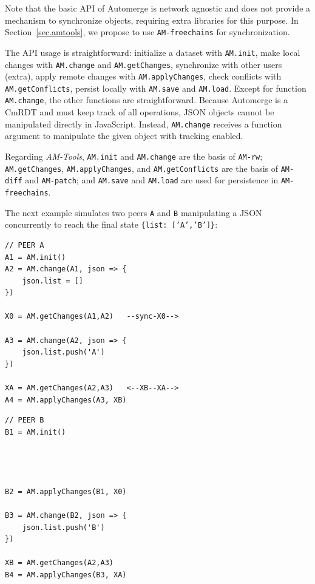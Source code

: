 \documentclass[12pt]{article}
\newcommand{\AMT}      {\emph{AM-Tools}\xspace}
\newcommand{\code}[1]  {\texttt{\footnotesize{#1}}}
\newcommand{\amrw}       {\texttt{AM-rw}\xspace}
\newcommand{\amdiff}     {\texttt{AM-diff}\xspace}
\newcommand{\ampatch}    {\texttt{AM-patch}\xspace}
\begin{document}
Note that the basic API of Automerge is network agnostic and does not provide
a mechanism to synchronize objects, requiring extra libraries for this purpose.
In Section~\ref{sec.amtools}, we propose to use \code{AM-freechains} for
synchronization.

The API usage is straightforward:
    initialize a dataset with \code{AM.init},
    make local changes with \code{AM.change} and \code{AM.getChanges},
    synchronize with other users (extra),
    apply remote changes with \code{AM.applyChanges},
    check conflicts with \code{AM.getConflicts},
    persist locally with \code{AM.save} and \code{AM.load}.
Except for function \code{AM.change}, the other functions are straightforward.
%
Because Automerge is a CmRDT and must keep track of all operations, JSON
objects cannot be manipulated directly in JavaScript.
Instead, \code{AM.change} receives a function argument to manipulate
the given object with tracking enabled.

Regarding \AMT,
    \code{AM.init} and \code{AM.change} are the basis of \amrw;
    \code{AM.getChanges}, \code{AM.applyChanges}, and \code{AM.getConflicts}
    are the basis of \amdiff and \ampatch; and
    \code{AM.save} and \code{AM.load} are used for persistence in
    \code{AM-freechains}.

The next example simulates two peers \code{A} and \code{B} manipulating a
JSON concurrently to reach the final state \code{\{list:~['A','B']\}}:

\noindent
{\footnotesize
\begin{minipage}[t]{0.6\textwidth}
\begin{verbatim}
// PEER A
A1 = AM.init()
A2 = AM.change(A1, json => {
    json.list = []
})

X0 = AM.getChanges(A1,A2)   --sync-X0-->

A3 = AM.change(A2, json => {
    json.list.push('A')
})

XA = AM.getChanges(A2,A3)   <--XB--XA-->
A4 = AM.applyChanges(A3, XB)
\end{verbatim}
\end{minipage}
\begin{minipage}[t]{0.4\textwidth}
\begin{verbatim}
// PEER B
B1 = AM.init()




B2 = AM.applyChanges(B1, X0)

B3 = AM.change(B2, json => {
    json.list.push('B')
})

XB = AM.getChanges(A2,A3)
B4 = AM.applyChanges(B3, XA)
\end{verbatim}
\end{minipage}
}
\end{document}
